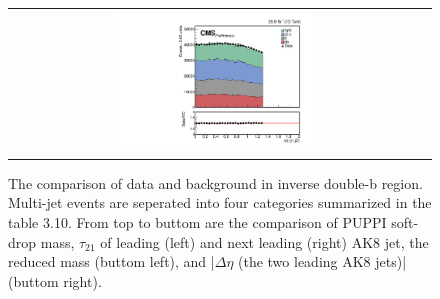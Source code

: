 \begin{figure}[t]
\begin{tabular}{cc}
    \includegraphics[width=0.5\textwidth]{Figures/dataMC_trig_antiDBT/deltaEta.pdf} \\
  \end{tabular}
  \caption{The comparison of data and background in inverse double-b region. Multi-jet events are seperated into four categories summarized in the table 3.10. From top to buttom are the comparison of PUPPI soft-drop mass, $\tau _{21}$ of leading (left) and next leading (right) AK8 jet, the reduced mass (buttom left), and |$\Delta \eta $ (the two leading AK8 jets)| (buttom right).}
  \label{fig:hvt_brs}
\end{figure}

